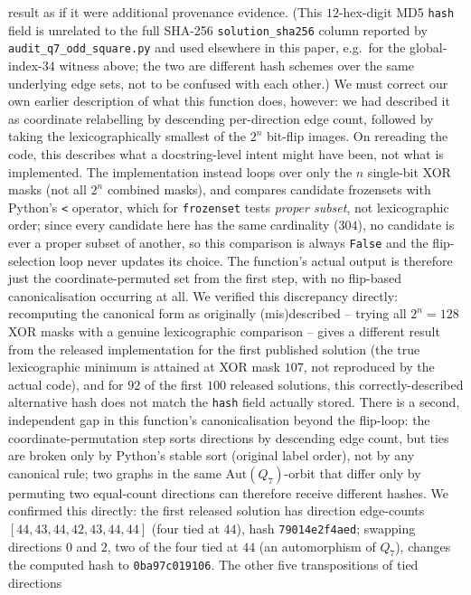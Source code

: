 \documentclass[12pt,a4paper]{article}
\theoremstyle{definition}
\begin{document}
result as if it were additional provenance evidence. (This $12$-hex-digit MD5
\texttt{hash} field is unrelated to the full SHA-256
\texttt{solution\_sha256} column reported by
\texttt{audit\_q7\_odd\_square.py} and used elsewhere in this paper,
e.g.\ for the global-index-$34$ witness above; the two are different
hash schemes over the same underlying edge sets, not to be confused
with each other.) We must correct our own earlier
description of what this function does, however: we had described it
as coordinate relabelling by descending per-direction edge count,
followed by taking the lexicographically smallest of the $2^n$
bit-flip images. On rereading the code, this describes what a
docstring-level intent might have been, not what is implemented. The
implementation instead loops over only the $n$ single-bit XOR masks
(not all $2^n$ combined masks), and compares candidate frozensets with
Python's \texttt{<} operator, which for \texttt{frozenset} tests
\emph{proper subset}, not lexicographic order; since every candidate
here has the same cardinality ($304$), no candidate is ever a proper
subset of another, so this comparison is always \texttt{False} and the
flip-selection loop never updates its choice. The function's actual
output is therefore just the coordinate-permuted set from the first
step, with no flip-based canonicalisation occurring at all. We
verified this discrepancy directly: recomputing the canonical form as
originally (mis)described -- trying all $2^n=128$ XOR masks with a
genuine lexicographic comparison -- gives a different result from the
released implementation for the first published solution (the true
lexicographic minimum is attained at XOR mask $107$, not reproduced by
the actual code), and for $92$ of the first $100$ released solutions,
this correctly-described alternative hash does not match the
\texttt{hash} field actually stored. There is a second, independent
gap in this function's canonicalisation beyond the flip-loop: the
coordinate-permutation step sorts directions by descending edge count,
but ties are broken only by Python's stable sort (original label
order), not by any canonical rule; two graphs in the same
$\mathrm{Aut}(Q_7)$-orbit that differ only by permuting two
equal-count directions can therefore receive different hashes. We
confirmed this directly: the first released solution has direction
edge-counts $[44,43,44,42,43,44,44]$ (four tied at $44$), hash
\texttt{79014e2f4aed}; swapping directions $0$ and $2$, two of the four
tied at $44$ (an automorphism of $Q_7$), changes the computed hash to
\texttt{0ba97c019106}. The other five transpositions of tied directions
\end{document}
